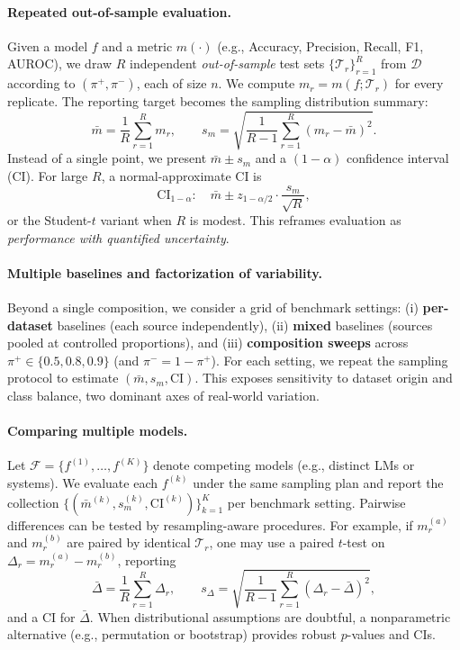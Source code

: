 \documentclass[11pt]{article}
\begin{document}
\paragraph{Repeated out-of-sample evaluation.}
Given a model $f$ and a metric $m(\cdot)$ (e.g., Accuracy, Precision, Recall, F1, AUROC), we draw $R$ independent \emph{out-of-sample} test sets $\{\mathcal{T}_r\}_{r=1}^{R}$ from $\mathcal{D}$ according to $(\pi^{+}, \pi^{-})$, each of size $n$.
We compute $m_r = m(f;\mathcal{T}_r)$ for every replicate.
The reporting target becomes the sampling distribution summary:
\begin{equation*}
\bar{m}=\frac{1}{R}\sum_{r=1}^{R} m_r,\qquad
s_m=\sqrt{\frac{1}{R-1}\sum_{r=1}^{R} (m_r - \bar{m})^2}.
\end{equation*}
Instead of a single point, we present $\bar{m} \pm s_m$ and a $(1-\alpha)$ confidence interval (CI).
For large $R$, a normal-approximate CI is
\begin{equation*}
\text{CI}_{1-\alpha}: \quad \bar{m} \pm z_{1-\alpha/2}\cdot \frac{s_m}{\sqrt{R}},
\end{equation*}
or the Student-$t$ variant when $R$ is modest.
This reframes evaluation as \emph{performance with quantified uncertainty}.

\paragraph{Multiple baselines and factorization of variability.}
Beyond a single composition, we consider a grid of benchmark settings:
(i) \textbf{per-dataset} baselines (each source independently),
(ii) \textbf{mixed} baselines (sources pooled at controlled proportions), and
(iii) \textbf{composition sweeps} across $\pi^{+}\in\{0.5,0.8,0.9\}$ (and $\pi^{-}=1-\pi^{+}$).
For each setting, we repeat the sampling protocol to estimate $(\bar{m}, s_m, \text{CI})$.
This exposes sensitivity to dataset origin and class balance, two dominant axes of real-world variation.

\paragraph{Comparing multiple models.}
Let $\mathcal{F}=\{f^{(1)},\dots,f^{(K)}\}$ denote competing models (e.g., distinct LMs or systems).
We evaluate each $f^{(k)}$ under the same sampling plan and report the collection $\{(\bar{m}^{(k)}, s_m^{(k)}, \text{CI}^{(k)})\}_{k=1}^{K}$ per benchmark setting.
Pairwise differences can be tested by resampling-aware procedures.
For example, if $m_r^{(a)}$ and $m_r^{(b)}$ are paired by identical $\mathcal{T}_r$, one may use a paired $t$-test on $\Delta_r = m_r^{(a)} - m_r^{(b)}$, reporting
\begin{equation*}
\bar{\Delta}=\frac{1}{R}\sum_{r=1}^{R} \Delta_r,\qquad
s_\Delta=\sqrt{\frac{1}{R-1}\sum_{r=1}^{R}(\Delta_r-\bar{\Delta})^2},
\end{equation*}
and a CI for $\bar{\Delta}$.
When distributional assumptions are doubtful, a nonparametric alternative (e.g., permutation or bootstrap) provides robust $p$-values and CIs.
\end{document}
